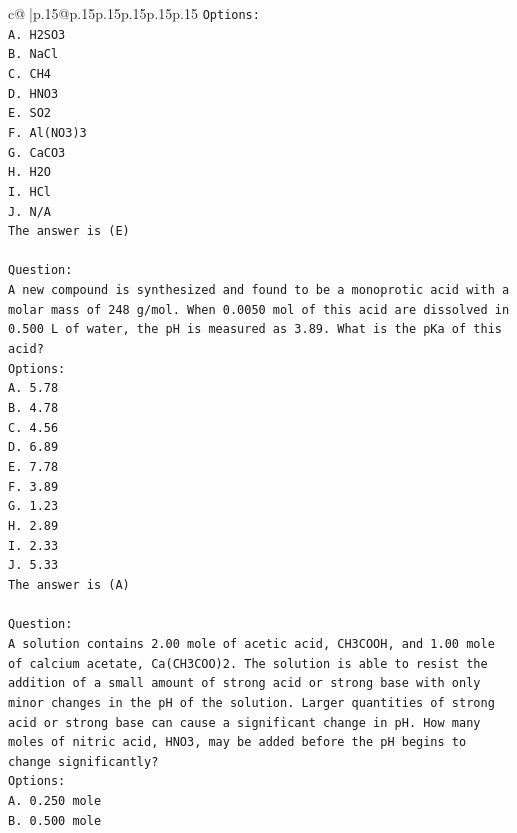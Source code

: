 \documentclass{article}
\begin{document}
{\begin{supertabular}{c@{$\;$}|p{.15\linewidth}@{}p{.15\linewidth}p{.15\linewidth}p{.15\linewidth}p{.15\linewidth}p{.15\linewidth}}
{{{\texttt{Options:} \\
\texttt{A. H2SO3} \\
\texttt{B. NaCl} \\
\texttt{C. CH4} \\
\texttt{D. HNO3} \\
\texttt{E. SO2} \\
\texttt{F. Al(NO3)3} \\
\texttt{G. CaCO3} \\
\texttt{H. H2O} \\
\texttt{I. HCl} \\
\texttt{J. N/A} \\
\texttt{The answer is (E)} \\
\\ 
\texttt{Question:} \\
\texttt{A new compound is synthesized and found to be a monoprotic acid with a molar mass of 248 g/mol. When 0.0050 mol of this acid are dissolved in 0.500 L of water, the pH is measured as 3.89. What is the pKa of this acid?} \\
\texttt{Options:} \\
\texttt{A. 5.78} \\
\texttt{B. 4.78} \\
\texttt{C. 4.56} \\
\texttt{D. 6.89} \\
\texttt{E. 7.78} \\
\texttt{F. 3.89} \\
\texttt{G. 1.23} \\
\texttt{H. 2.89} \\
\texttt{I. 2.33} \\
\texttt{J. 5.33} \\
\texttt{The answer is (A)} \\
\\ 
\texttt{Question:} \\
\texttt{A solution contains 2.00 mole of acetic acid, CH3COOH, and 1.00 mole of calcium acetate, Ca(CH3COO)2. The solution is able to resist the addition of a small amount of strong acid or strong base with only minor changes in the pH of the solution. Larger quantities of strong acid or strong base can cause a significant change in pH. How many moles of nitric acid, HNO3, may be added before the pH begins to change significantly?} \\
\texttt{Options:} \\
\texttt{A. 0.250 mole} \\
\texttt{B. 0.500 mole} \\
}}}
\end{supertabular}}
\end{document}
